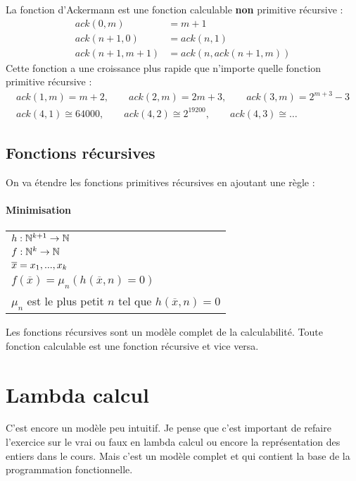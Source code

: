 \begin{myexem}
	La fonction d'Ackermann est une fonction calculable \textbf{non}
	primitive récursive :
	\begin{align*}
		ack(0,m) &= m+1 \\
		ack(n+1,0) &= ack(n,1)\\
		ack(n+1,m+1) &= ack(n, ack(n+1,m))
	\end{align*}
	Cette fonction a une croissance plus rapide que n'importe quelle fonction
	primitive récursive :
	\begin{align*}
		ack(1,m) = m+2,\qquad ack(2,m) = 2m+3,\qquad ack(3,m)=2^{m+3}-3\\
		ack(4,1) \cong 64 000,\qquad ack(4,2) \cong 2^{19200},\qquad ack(4,3) \cong \dots
	\end{align*}
\end{myexem}


\subsection{Fonctions récursives}
\label{ssub:fonctions_r_cursives}
On va étendre les fonctions primitives récursives en ajoutant une règle :

\paragraph{Minimisation}
\begin{tabular}{|l|}
	\hline
	$h: \mathbb{N}^{k+1} \rightarrow \mathbb{N}$\\
	$f: \mathbb{N}^{k} \rightarrow \mathbb{N}$\\
	$\overline{x} =x_1,...,x_k$ \\
	$f(\overline{x}) = \mu_n (h(\overline{x}, n) = 0)$\\
	$\mu_n$ est le plus petit $n$ tel que $h(\overline{x}, n) = 0$ \\
	\hline
\end{tabular}

\begin{myprop}
	Les fonctions récursives sont un modèle complet de la calculabilité.
	Toute fonction calculable est une fonction récursive et vice versa.
\end{myprop}

\section{Lambda calcul}
\label{sub:lambda_calcul}
\begin{myrem}%
	C'est encore un modèle peu intuitif. Je pense que c'est important
	de refaire l'exercice sur le vrai ou faux en lambda calcul ou encore la
	représentation des entiers dans le cours. Mais c'est un modèle complet
	et qui contient la base de la programmation fonctionnelle.
\end{myrem}

